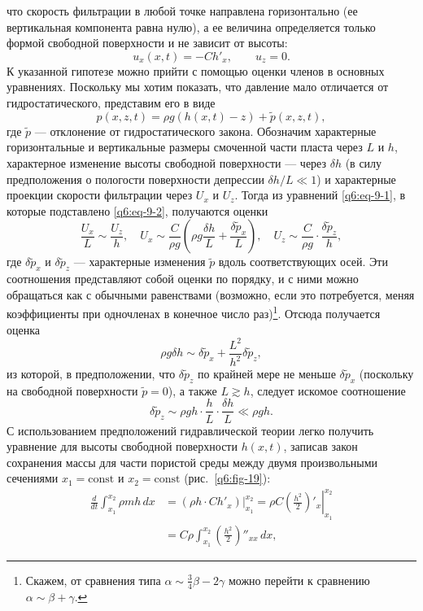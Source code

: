 что скорость фильтрации в любой точке направлена горизонтально (ее вертикальная компонента равна нулю), а ее величина определяется только формой свободной поверхности и не зависит от высоты:
\[u_x(x,t)=-Ch'_x,\qquad u_z=0.\]
К указанной гипотезе можно прийти с помощью оценки членов в основных уравнениях. Поскольку мы хотим показать, что давление мало отличается от гидростатического, представим его в виде
\begin{equation}p(x,z,t)=\rho g(h(x,t)-z)+\widetilde p(x,z,t),\tag{9.2}\label{q6:eq-9-2}\end{equation}
где $\widetilde p$ --- отклонение от гидростатического закона. Обозначим характерные горизонтальные и вертикальные размеры смоченной части пласта через $L$ и $h$, характерное изменение высоты свободной поверхности --- через $\delta h$ (в силу предположения о пологости поверхности депрессии $\delta h/L\ll1$) и характерные проекции скорости фильтрации через $U_x$ и $U_z$. Тогда из уравнений \eqref{q6:eq-9-1}, в которые подставлено \eqref{q6:eq-9-2}, получаются оценки
\[\frac{U_x}{L}\sim\frac{U_z}{h},\quad U_x\sim\frac{C}{\rho g}\left(\rho g\frac{\delta h}{L}+\frac{\delta\widetilde p_x}{L}\right),\quad U_z\sim\frac{C}{\rho g}\cdot\frac{\delta\widetilde p_z}{h},\]
где $\delta\widetilde p_x$ и $\delta\widetilde p_z$ --- характерные изменения $\widetilde p$ вдоль соответствующих осей. Эти соотношения представляют собой оценки по порядку, и с ними можно обращаться как с обычными равенствами (возможно, если это потребуется, меняя коэффициенты при одночленах в конечное число раз)\setcounter{footnote}{0}\footnote{Скажем, от сравнения типа $\alpha\sim\frac34\beta-2\gamma$ можно перейти к сравнению $\alpha\sim\beta+\gamma$.}. Отсюда получается оценка
\[\rho g\delta h\sim\delta\widetilde p_x+\frac{L^2}{h^2}\delta\widetilde p_z,\]
из которой, в предположении, что $\delta\widetilde p_z$ по крайней мере не меньше $\delta\widetilde p_x$ (поскольку на свободной поверхности $\widetilde p=0$), а также $L\gtrsim h$, следует искомое соотношение
\[\delta\widetilde p_z\sim\rho gh\cdot\frac{h}{L}\cdot\frac{\delta h}{L}\ll\rho gh.\]
С использованием предположений гидравлической теории легко получить уравнение для высоты свободной поверхности $h(x,t)$, записав закон
сохранения массы для части пористой среды между двумя произвольными сечениями $x_1=\mathrm{const}$ и $x_2=\mathrm{const}$ (рис.~\ref{q6:fig-19}):
\[\begin{aligned}
\frac{d}{dt}\int_{x_1}^{x_2}\rho mh\,dx&=\left.(\rho h\cdot Ch'_x)\right|_{x_1}^{x_2}=\left.\rho C\left(\frac{h^2}{2}\right)'_x\right|_{x_1}^{x_2}\\
&=C\rho\int_{x_1}^{x_2}\left(\frac{h^2}{2}\right)''_{xx}\,dx,
\end{aligned}\]
